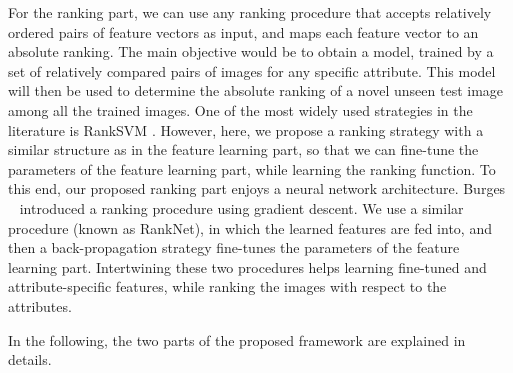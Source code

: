 For the ranking part, we can use any ranking procedure that accepts relatively ordered pairs of feature vectors as input, and maps each feature vector to an absolute ranking. The main objective would be to obtain a model, trained by a set of relatively compared pairs of images for any specific attribute. This model will then be used to determine the absolute ranking of a novel unseen test image among all the trained images. One of the most widely used strategies in the literature is RankSVM \cite{Joachims2002}. However, here, we propose a ranking strategy with a similar structure as in the feature learning part, so that we can fine-tune the parameters of the feature learning part, while learning the ranking function. To this end, our proposed ranking part enjoys a neural network architecture. Burges \etal~\cite{Burges2005} introduced a ranking procedure using gradient descent. We use a similar procedure (known as RankNet), in which the learned features are fed into, and then a back-propagation strategy fine-tunes the parameters of the feature learning part. Intertwining these two procedures helps learning fine-tuned and attribute-specific features, while ranking the images with respect to the attributes. 


In the following, the two parts of the proposed framework are explained in details.

